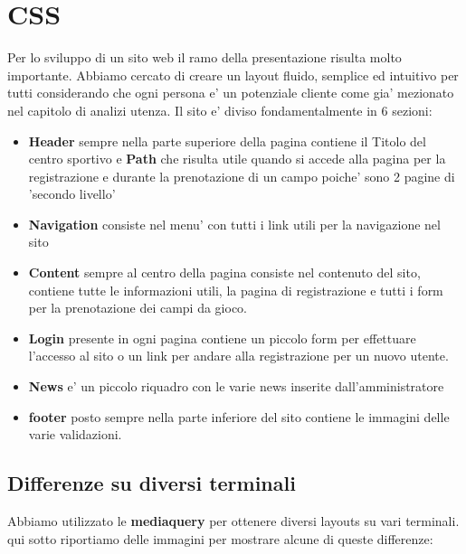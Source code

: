 \section{CSS}

Per lo sviluppo di un sito web il ramo della presentazione risulta molto importante. Abbiamo cercato di creare un layout fluido, semplice ed intuitivo per tutti considerando che ogni persona e' un potenziale cliente come gia' mezionato nel capitolo di analizi utenza.
Il sito e' diviso fondamentalmente in 6 sezioni:
\begin{itemize}
	\item \textbf{Header} sempre nella parte superiore della pagina contiene il Titolo del centro sportivo e \textbf{Path} che risulta utile quando si accede alla pagina per la registrazione e durante la prenotazione di un campo poiche' sono 2 pagine di 'secondo livello'
	\item	\textbf{Navigation} consiste nel menu' con tutti i link utili per la navigazione nel sito
	\item \textbf{Content} sempre al centro della pagina consiste nel contenuto del sito, contiene tutte le informazioni utili, la pagina di registrazione e tutti i form per la prenotazione dei campi da gioco.
	\item \textbf{Login} presente in ogni pagina contiene un piccolo form per effettuare l'accesso al sito o un link per andare alla registrazione per un nuovo utente.
	\item \textbf{News} e' un piccolo riquadro con le varie news inserite dall'amministratore
	\item \textbf{footer} posto sempre nella parte inferiore del sito contiene le immagini delle varie validazioni.
\end{itemize}

\subsection{Differenze su diversi terminali}

Abbiamo utilizzato le \textbf{mediaquery} per ottenere diversi layouts su vari terminali.
qui sotto riportiamo delle immagini per mostrare alcune di queste differenze:

